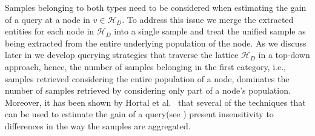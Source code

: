 \documentclass{vldb}
\newcommand{\domain}{\mathcal{D}}
\newcommand{\hierarchy}{\mathcal{H}_D}
\begin{document}
Samples belonging to both types need to be considered when estimating the gain of a query at a node in $v \in \hierarchy$. To address this issue we merge the extracted entities for each node in $\hierarchy$ into a single sample and treat the unified sample as being extracted from the entire underlying population of the node. As we discuss later in  we develop querying strategies that traverse the lattice $\hierarchy$ in a top-down approach, hence, the number of samples belonging in the first category, i.e., samples retrieved considering the entire population of a node, dominates the number of samples retrieved by considering only part of a node's population. Moreover, it has been shown by Hortal et al.~\cite{hortal2006evaluating} that several of the techniques that can be used to estimate the gain of a query(see ) present insensitivity to differences in the way the samples are aggregated.

\end{document}
